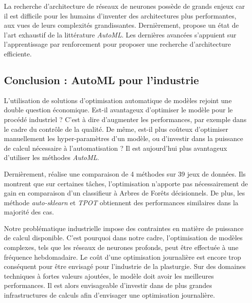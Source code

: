 La recherche d'architecture de réseaux de neurones possède de grands enjeux car il est difficile pour les humains d'inventer des architectures plus performantes, aux vues de leurs complexités grandissantes.
Dernièrement, \cite{elsken_neural_2018} propose un état de l'art exhaustif de la littérature \textit{AutoML}.
Les dernières avancées s'appuient sur l'apprentissage par renforcement pour proposer une recherche d'architecture efficiente.


\subsection{Conclusion : AutoML pour l'industrie}
L'utilisation de solutions d'optimisation automatique de modèles rejoint une double question économique.
Est-il avantageux d'optimiser le modèle pour le procédé industriel ? C'est à dire d'augmenter les performances, par exemple dans le cadre du contrôle de la qualité.
De même, est-il plus coûteux d'optimiser manuellement les hyper-paramètres d'un modèle, ou d'investir dans la puissance de calcul nécessaire à l'automatisation ?
Il est aujourd'hui plus avantageux d'utiliser les méthodes \textit{AutoML}.

Dernièrement, \cite{gijsbers_open_2019} réalise une comparaison de 4 méthodes sur 39 jeux de données.
Ils montrent que sur certaines tâches, l'optimisation n'apporte pas nécessairement de gain en comparaison d'un classifieur à Arbres de Forêts décisionnels.
De plus, les méthode \textit{auto-sklearn} et \textit{TPOT} obtiennent des performances similaires dans la majorité des cas.

Notre problématique industrielle impose des contraintes en matière de puissance de calcul disponible.
C'est pourquoi dans notre cadre, l'optimisation de modèles complexes, tels que les réseaux de neurones profonds, peut être effectuée à une fréquence hebdomadaire.
Le coût d'une optimisation journalière est encore trop conséquent pour être envisagé pour l'industrie de la plasturgie.
Sur des domaines techniques à fortes valeurs ajoutées, le modèle doit avoir les meilleures performances.
Il est alors envisageable d'investir dans de plus grandes infrastructures de calculs afin d'envisager une optimisation journalière.


